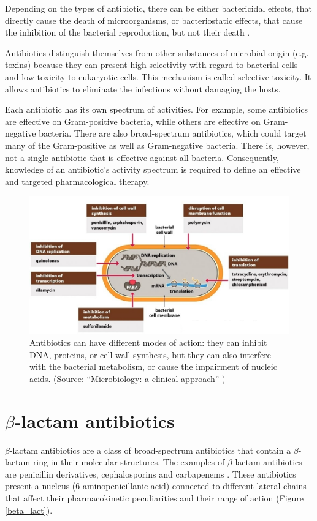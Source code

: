 \documentclass[11pt]{report}
\begin{document}
Depending on the types of antibiotic, there can be either bactericidal effects, that directly cause the death of microorganisms, or bacteriostatic effects, that cause the inhibition of the bacterial reproduction, but not their death \cite{Leekha2011}.

Antibiotics distinguish themselves from other substances of microbial origin (e.g. toxins) because they can present high selectivity with regard to bacterial cells and low toxicity to eukaryotic cells. This mechanism is called selective toxicity. It allows antibiotics to eliminate the infections without damaging the hosts.

Each antibiotic has its own spectrum of activities. For example, some antibiotics are effective on Gram-positive bacteria, while others are effective on Gram-negative bacteria.
There are also broad-spectrum antibiotics, which could target many of the Gram-positive as well as Gram-negative bacteria.
There is, however, not a single antibiotic that is effective against all bacteria.
Consequently, knowledge of an antibiotic’s activity spectrum is required to define an effective and targeted pharmacological therapy.

\clearpage
\begin{figure}[htp]
\centering
\includegraphics[scale=0.4500]{img/ant_targ.png}
\caption{Antibiotics can have different modes of action: they can inhibit DNA, proteins, or cell wall synthesis, but they can also interfere with the bacterial metabolism, or cause the impairment of nucleic acids. (Source: ``Microbiology: a clinical approach'' \cite{microbiology})}
\label{ant_targ}
\end{figure}

\section{$\beta$-lactam antibiotics}
$\beta$-lactam antibiotics are a class of broad-spectrum antibiotics that contain a $\beta$-lactam ring in their molecular structures.
The examples of $\beta$-lactam antibiotics are penicillin derivatives, cephalosporins and carbapenems \cite{Pitout2005}.
These antibiotics present a nucleus (6-aminopenicillanic acid) connected to different lateral chains that affect their pharmacokinetic peculiarities and their range of action (Figure \ref{beta_lact}).
\end{document}

